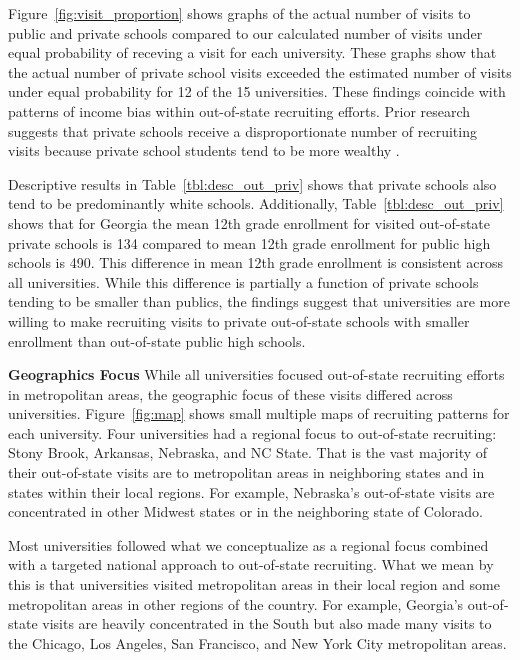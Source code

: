 \documentclass[twoside]{article}
\begin{document}

Figure~\ref{fig:visit_proportion} shows graphs of the actual number of visits to public and private schools compared to our calculated number of visits under equal probability of receving a visit for each university. These graphs show that the actual number of private school visits exceeded the estimated number of visits under equal probability for 12 of the 15 universities. These findings coincide with patterns of income bias within out-of-state recruiting efforts. Prior research suggests that private schools receive a disproportionate number of recruiting visits because private school students tend to be more wealthy \citep{RN3519}.

Descriptive results in Table~\ref{tbl:desc_out_priv} shows that private schools also tend to be predominantly white schools. Additionally, Table~\ref{tbl:desc_out_priv} shows that for Georgia the mean 12th grade enrollment for visited out-of-state private schools is 134 compared to mean 12th grade enrollment for public high schools is 490. This difference in mean 12th grade enrollment is consistent across all universities. While this difference is partially a function of private schools tending to be smaller than publics, the findings suggest that universities are more willing to make recruiting visits to private out-of-state schools with smaller enrollment than out-of-state public high schools.

\textbf{Geographics Focus} While all universities focused out-of-state recruiting efforts in metropolitan areas, the geographic focus of these visits differed across universities. Figure~\ref{fig:map} shows small multiple maps of recruiting patterns for each university. Four universities had a regional focus to out-of-state recruiting: Stony Brook, Arkansas, Nebraska, and NC State. That is the vast majority of their out-of-state visits are to metropolitan areas in neighboring states and in states within their local regions. For example, Nebraska's out-of-state visits are concentrated in other Midwest states or in the neighboring state of Colorado.

Most universities followed what we conceptualize as a regional focus combined with a targeted national approach to out-of-state recruiting. What we mean by this is that universities visited metropolitan areas in their local region and some metropolitan areas in other regions of the country. For example, Georgia's out-of-state visits are heavily concentrated in the South but also made many visits to the Chicago, Los Angeles, San Francisco, and New York City metropolitan areas. 
\end{document}
